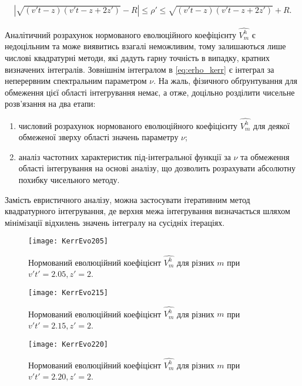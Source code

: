 \begin{equation} \begin{aligned}
\left| \sqrt{(v't - z) (v't - z + 2 z')} - R \right| \leq \rho' \leq 
\sqrt{(v't - z) (v't - z + 2 z')} + R.
\end{aligned} \end{equation}

Аналітичний розрахунок нормованого еволюційного коефіцієнту $ \hat{V_m^h} $
є недоцільним та може виявитись взагалі неможливим, тому залишаються лише
числові квадратурні методи, які дадуть гарну точність в випадку,
кратних визначених інтегралів. Зовнішнім інтегралом в \eqref{eq:erho_kerr} є 
інтеграл за неперервним спектральним параметром $ \nu $. На жаль, фізичного
обґрунтування для обмеження цієї області інтегрування немає, а отже,
доцільно розділити чисельне розв'язання на два етапи:

\begin{enumerate}
	\item числовий розрахунок нормованого еволюційного коефіцієнту 
	$ \hat{V_m^h} $ для деякої обмеженої зверху області значень 
	параметру $ \nu $;
	\item аналіз частотних характеристик під-інтегральної функції за 
	$ \nu $ та обмеження області інтегрування на основі аналізу, що 
	дозволить розрахувати абсолютну похибку чисельного методу.
\end{enumerate}

Замість евристичного аналізу, можна застосувати ітеративним метод 
квадратурного інтегрування, де верхня межа інтегрування визначається 
шляхом мінімізації відхилень значень інтегралу на сусідніх ітераціях.

\begin{figure}[htbp] \begin{center}
\texttt{[image: KerrEvo205]}
\caption{Нормований еволюційний коефіцієнт $ \hat{V_m^h} $ для 
різних $ m $ при $ v't' = 2.05, z' = 2 $.} 
\label{fig:KerrEvo205}
\end{center} \end{figure}

\begin{figure}[htbp] \begin{center}
\texttt{[image: KerrEvo215]}
\caption{Нормований еволюційний коефіцієнт $ \hat{V_m^h} $ для 
різних $ m $ при $ v't' = 2.15, z' = 2 $.} 
\label{fig:KerrEvo215}
\end{center} \end{figure}

\begin{figure}[htbp] \begin{center}
\texttt{[image: KerrEvo220]}
\caption{Нормований еволюційний коефіцієнт $ \hat{V_m^h} $ для 
різних $ m $ при $ v't' = 2.20, z' = 2 $.} 
\label{fig:KerrEvo220}
\end{center} \end{figure}

